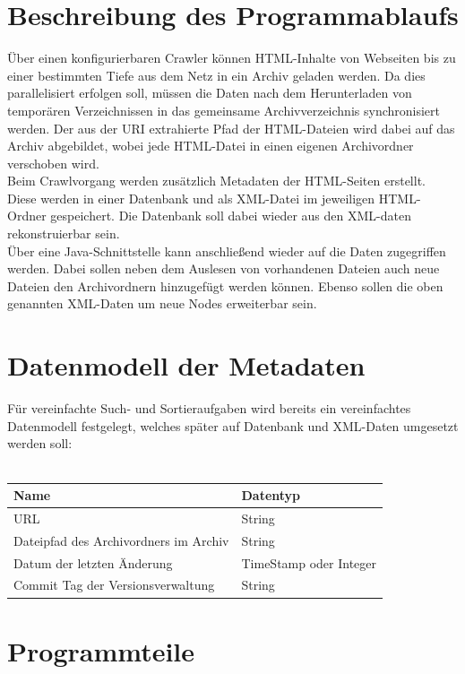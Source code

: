 \chapter{Beschreibung des Programmablaufs}
Über einen konfigurierbaren Crawler können HTML-Inhalte von Webseiten bis zu einer bestimmten Tiefe
aus dem Netz in ein Archiv geladen werden. Da dies parallelisiert erfolgen soll,
müssen die Daten nach dem Herunterladen von temporären Verzeichnissen in das gemeinsame
Archivverzeichnis synchronisiert werden. Der aus der URI extrahierte Pfad der HTML-Dateien wird
dabei auf das Archiv abgebildet, wobei jede HTML-Datei in einen eigenen Archivordner verschoben wird. \\
Beim Crawlvorgang werden zusätzlich Metadaten der HTML-Seiten erstellt. 
Diese werden in einer Datenbank und als XML-Datei im jeweiligen HTML-Ordner gespeichert.
Die Datenbank soll dabei wieder aus den XML-daten rekonstruierbar sein. \\
Über eine Java-Schnittstelle kann anschließend wieder auf die Daten zugegriffen werden.
Dabei sollen neben dem Auslesen von vorhandenen Dateien auch neue Dateien den Archivordnern hinzugefügt werden können.
Ebenso sollen die oben genannten XML-Daten um neue Nodes erweiterbar sein.

\chapter{Datenmodell der Metadaten}
Für vereinfachte Such- und Sortieraufgaben wird bereits ein vereinfachtes Datenmodell festgelegt, welches
später auf Datenbank und XML-Daten umgesetzt werden soll: \\\\
\begin{tabular}{|l|l|}
	\hline
	Name & Datentyp \\
	\hline
	URL & String \\
	Dateipfad des Archivordners im Archiv & String \\
	Datum der letzten Änderung & TimeStamp oder Integer \\
	Commit Tag der Versionsverwaltung & String \\
	\hline
\end{tabular}

\chapter{Programmteile}

